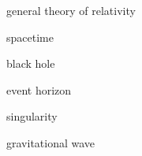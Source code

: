 \documentclass{article}
\begin{document}
\gls{general theory of relativity}

\gls{spacetime}

\gls{black hole}

\gls{event horizon}

\gls{singularity}

\gls{gravitational wave}

\clearpage

\printglossaries
\end{document}
